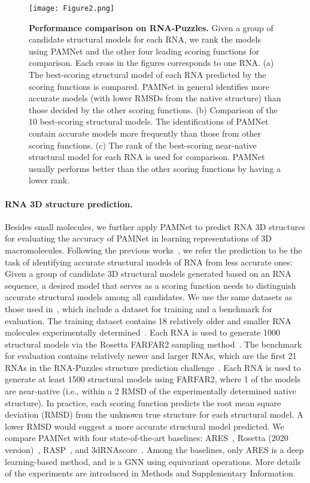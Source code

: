 \documentclass[fleqn,10pt]{wlscirep}
\newcommand{\method}{PAMNet\xspace}
\begin{document}
\begin{figure}[t]
    \centering
    \texttt{[image: Figure2.png]}
    \caption{\label{fig:benchmark}\textbf{Performance comparison on RNA-Puzzles.} Given a group of candidate structural models for each RNA, we rank the models using \method and the other four leading scoring functions for comparison. Each cross in the figures corresponds to one RNA. (a) The best-scoring structural model of each RNA predicted by the scoring functions is compared. \method in general identifies more accurate models (with lower RMSDs from the native structure) than those decided by the other scoring functions. (b) Comparison of the 10 best-scoring structural models. The identifications of \method contain accurate models more frequently than those from other scoring functions. (c) The rank of the best-scoring near-native structural model for each RNA is used for comparison. \method usually performs better than the other scoring functions by having a lower rank.}
\end{figure}


\paragraph{RNA 3D structure prediction.}
Besides small molecules, we further apply \method to predict RNA 3D structures for evaluating the accuracy of \method in learning representations of 3D macromolecules. Following the previous works~\cite{wang20153drnascore,watkins2020farfar2,townshend2021geometric}, we refer the prediction to be the task of identifying accurate structural models of RNA from less accurate ones: Given a group of candidate 3D structural models generated based on an RNA sequence, a desired model that serves as a scoring function needs to distinguish accurate structural models among all candidates. We use the same datasets as those used in~\cite{townshend2021geometric}, which include a dataset for training and a benchmark for evaluation. The training dataset contains 18 relatively older and smaller RNA molecules experimentally determined~\cite{das2007automated}. Each RNA is used to generate 1000 structural models via the Rosetta FARFAR2 sampling method~\cite{watkins2020farfar2}. The benchmark for evaluation contains relatively newer and larger RNAs, which are the first 21 RNAs in the RNA-Puzzles structure prediction challenge~\cite{miao2020rna}. Each RNA is used to generate at least 1500 structural models using FARFAR2, where 1 of the models are near-native (i.e., within a 2 RMSD of the experimentally determined native structure). In practice, each scoring function predicts the root mean square deviation (RMSD) from the unknown true structure for each structural model. A lower RMSD would suggest a more accurate structural model predicted. We compare \method with four state-of-the-art baselines: ARES~\cite{townshend2021geometric}, Rosetta (2020 version)~\cite{watkins2020farfar2}, RASP~\cite{capriotti2011all}, and 3dRNAscore~\cite{wang20153drnascore}. Among the baselines, only ARES is a deep learning-based method, and is a GNN using equivariant operations. More details of the experiments are introduced in Methods and Supplementary Information.
\end{document}
